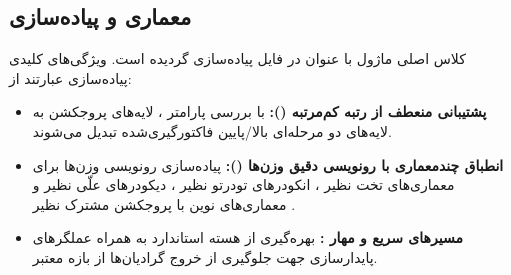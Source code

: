 \subsection{معماری و پیاده‌سازی}
کلاس اصلی ماژول با عنوان  در فایل  پیاده‌سازی گردیده است. ویژگی‌های کلیدی پیاده‌سازی عبارتند از:
\begin{itemize}
    \item \textbf{پشتیبانی منعطف از رتبه کم‌مرتبه ():} با بررسی پارامتر ، لایه‌های پروجکشن به لایه‌های دو مرحله‌ای بالا/پایین فاکتورگیری‌شده تبدیل می‌شوند.
    \item \textbf{انطباق چندمعماری با رونویسی دقیق وزن‌ها ():} پیاده‌سازی رونویسی وزن‌ها برای معماری‌های تخت نظیر ، انکودرهای تودرتو نظیر ، دیکودرهای علّی نظیر  و معماری‌های نوین با پروجکشن مشترک نظیر .
    \item \textbf{مسیرهای سریع  و مهار :} بهره‌گیری از هسته استاندارد  به همراه عملگرهای پایدارسازی  جهت جلوگیری از خروج گرادیان‌ها از بازه معتبر.
\end{itemize}
